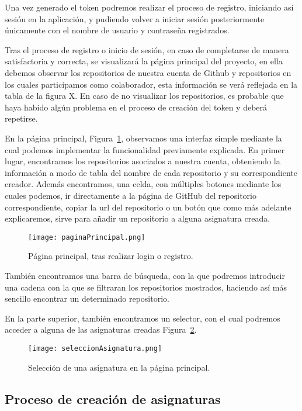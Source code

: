 Una vez generado el token podremos realizar el proceso de registro, iniciando así sesión en la aplicación, y pudiendo volver a iniciar sesión posteriormente únicamente con el nombre de usuario y contraseña registrados.


Tras el proceso de registro o inicio de sesión, en caso de completarse de manera satisfactoria y correcta, se visualizará la página principal del proyecto, en ella debemos observar los repositorios de nuestra cuenta de Github y repositorios en los cuales participamos como colaborador, esta información se verá reflejada en la tabla de la figura X.
En caso de no visualizar los repositorios, es probable que haya habido algún problema en el proceso de creación del token y deberá repetirse.

En la página principal, Figura~\ref{figure:mainPage}, observamos una interfaz simple mediante la cual podemos implementar la funcionalidad previamente explicada. En primer lugar, encontramos los repositorios asociados a nuestra cuenta, obteniendo la información a modo de tabla del nombre de cada repositorio y su correspondiente creador. Además encontramos, una celda, con múltiples botones mediante los cuales podemos, ir directamente a la página de GitHub del repositorio correspondiente, copiar la url del repositorio  o un botón que como más adelante explicaremos, sirve para añadir un repositorio a alguna asignatura creada.

\begin{figure}[h!]
  \texttt{[image: paginaPrincipal.png]}
  \caption{Página principal, tras realizar login o registro.}
  \label{figure:mainPage}
\end{figure}

También encontramos una barra de búsqueda, con la que podremos introducir una cadena con la que se filtraran los repositorios mostrados, haciendo así más sencillo encontrar un determinado repositorio.

En la parte superior, también encontramos un selector, con el cual podremos acceder a alguna de las asignaturas creadas Figura~\ref{figure:mainPageSeleccion}.
\begin{figure}[h!]
  \texttt{[image: seleccionAsignatura.png]}
  \caption{Selección de una asignatura en la página principal.}
  \label{figure:mainPageSeleccion}
\end{figure}


\subsection{Proceso de creación de asignaturas}

